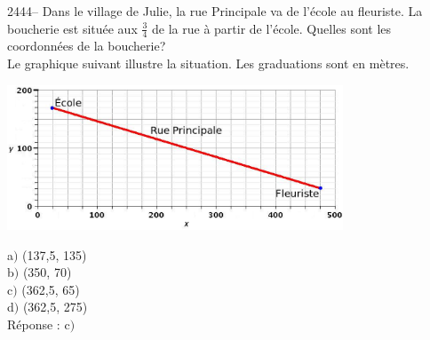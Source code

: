 \documentclass[letterpaper, 12pt]{article}
\begin{document}
2444-- Dans le village de Julie, la rue Principale va de l'\'ecole au fleuriste. La boucherie est situ\'ee aux $\frac{3}{4}$ de la rue \`a partir de l'\'ecole. Quelles sont les coordonn\'ees de la boucherie? \\
Le graphique suivant illustre la situation. Les graduations sont en m\`etres. \\
\begin{center}
 \includegraphics[width=10cm,bb=14 14 815 362]{Q2438.eps}
\end{center}
a$)$ (137,5, 135)\\
b$)$ (350, 70)\\
c$)$ (362,5, 65)\\
d$)$ (362,5, 275)\\

R\'eponse : c$)$\\
\end{document}
